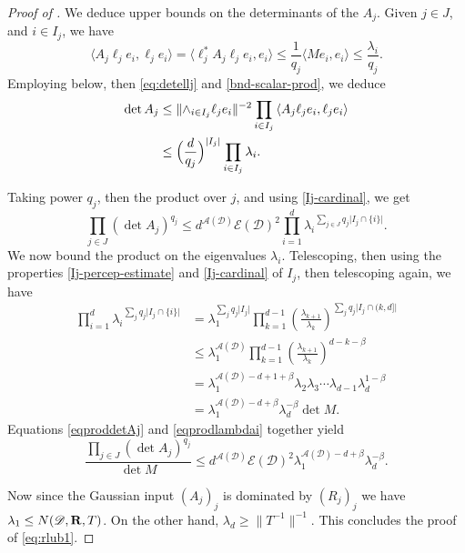 \documentclass[a4paper,english]{amsart}
\theoremstyle{definition}
\newcommand{\1}{\mathbbm{1}}
\newcommand{\bbR}{{\bf{R}}}
\newcommand{\sD} {{\mathscr D}}
\newcommand{\sE}{\mathscr{E}}
\newcommand{\sA}{\mathscr{A}}
\newcommand{\abs}[1]{\lvert#1\rvert}    %
\newcommand{\norm}[1]{\lVert#1\rVert}   %
\newcommand{\normbig}[1]{\bigl\lVert#1\bigr\rVert}
\begin{document}
\begin{proof}[Proof of ]
We deduce upper bounds on the determinants of the $A_{j}$.
Given $j \in J$, and $i\in I_j$, we have
\begin{equation}\label{bnd-scalar-prod}
{\langle A_{j}\ell_{j}e_{i},  \ell_{j} e_{i}\rangle} = {\langle \ell_{j}^*A_{j}\ell_{j}e_{i}, e_{i}\rangle} \leq \frac{1}{q_j} {\langle M e_{i}, e_{i}\rangle} \leq \frac{\lambda_i}{q_j}.
\end{equation}
Employing  below, then \eqref{eq:detellj} and \eqref{bnd-scalar-prod}, we deduce
\begin{align*}
{\det A_{j}} & \leq \norm{\wedge_{i\in I_{j}}\ell_{j}e_{i} }^{-2} \prod_{i\in I_{j}}{\langle A_{j}\ell_{j}e_{i},  \ell_{j} e_{i}\rangle}\\
&\leq \Bigl(\frac{d}{q_j}\Bigr)^{\abs{I_j}} \prod_{i\in I_{j}}\lambda_{i}.
\end{align*}

Taking power $q_{j}$, then the product over $j$, and using \eqref{Ij-cardinal}, we get
\begin{equation} \label{eqproddetAj}
\prod_{j\in J} (\det A_{j})^{q_{j}} \leq
d^{\sA(\sD)}\sE(\sD)^2
\prod_{i=1}^d{\lambda_{i}}^{\sum_{j \in J} q_{j}\abs{I_{j}\cap \{i\}}}.
\end{equation}
We now bound the product on the eigenvalues $\lambda_{i}$.
Telescoping, then using the properties  \eqref{Ij-percep-estimate} and \eqref{Ij-cardinal} of $I_{j}$, then telescoping again, we have
\begin{align}
 \prod_{i=1}^d{\lambda_{i}}^{\sum_{j}q_{j}\abs{I_{j} \cap \{i\}}}
 &= \lambda_{1}^{\sum_{j}q_{j}\abs{I_j}}\prod_{k=1}^{d-1} \left(\frac{\lambda_{k+1}}{\lambda_k}\right)^{\sum_{j}q_{j}\abs{I_{j}\cap (k,d]} } \nonumber\\
 &\leq \lambda_{1}^{\sA(\sD)}\prod_{k=1}^{d-1} \left(\frac{\lambda_{k+1}}{\lambda_k}\right)^{d-k-\beta} \nonumber\\
 &=\lambda_{1}^{\sA(\sD)-d+1+\beta} \lambda_{2}\lambda_{3}\dotsm \lambda_{d-1} \lambda_{d}^{1-\beta} \nonumber\\
 &= \lambda_{1}^{\sA(\sD)-d+\beta} \lambda_{d}^{-\beta}  \det M. \label{eqprodlambdai}
 \end{align}
Equations \eqref{eqproddetAj} and \eqref{eqprodlambdai} together yield
$$
\frac{\prod_{j\in J} (\det A_{j})^{q_{j}} }{{\det M}}\leq d^{\sA(\sD)}\sE(\sD)^2
\lambda_{1}^{\sA(\sD)-d+\beta} \lambda_{d}^{-\beta}.
$$

Now since the Gaussian input $(A_j)_j$ is dominated by $(R_j)_j$
we have $\lambda_{1}\leq N(\sD, \bbR, T)$.
On the other hand, $\lambda_{d} \geq \normbig{T^{-1}}^{-1}$.
This concludes the proof of \eqref{eq:rlub1}.
\end{proof}
\end{document}
